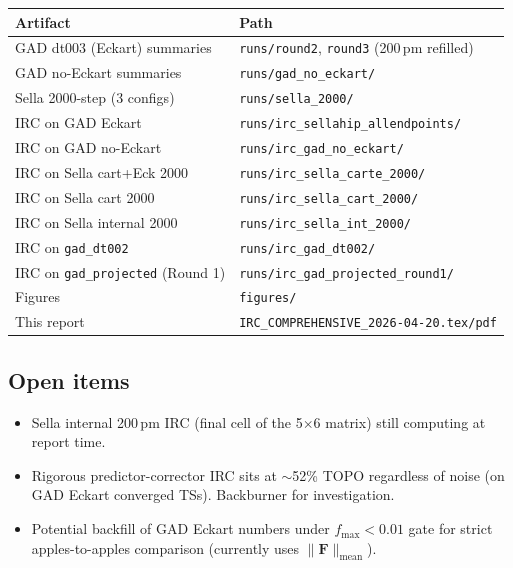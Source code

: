 \documentclass[11pt]{article}
\begin{document}
\begin{center}
\begin{tabular}{ll}
\toprule
Artifact & Path \\
\midrule
GAD dt003 (Eckart) summaries & \texttt{runs/round2}, \texttt{round3} (200\,pm refilled) \\
GAD no-Eckart summaries      & \texttt{runs/gad\_no\_eckart/} \\
Sella 2000-step (3 configs)  & \texttt{runs/sella\_2000/} \\
IRC on GAD Eckart            & \texttt{runs/irc\_sellahip\_allendpoints/} \\
IRC on GAD no-Eckart         & \texttt{runs/irc\_gad\_no\_eckart/} \\
IRC on Sella cart+Eck 2000   & \texttt{runs/irc\_sella\_carte\_2000/} \\
IRC on Sella cart 2000       & \texttt{runs/irc\_sella\_cart\_2000/} \\
IRC on Sella internal 2000   & \texttt{runs/irc\_sella\_int\_2000/} \\
IRC on \texttt{gad\_dt002}   & \texttt{runs/irc\_gad\_dt002/} \\
IRC on \texttt{gad\_projected} (Round 1) & \texttt{runs/irc\_gad\_projected\_round1/} \\
Figures                      & \texttt{figures/} \\
This report                  & \texttt{IRC\_COMPREHENSIVE\_2026-04-20.tex/pdf} \\
\bottomrule
\end{tabular}
\end{center}

\subsection{Open items}

\begin{itemize}[nosep,leftmargin=1.5em]
\item Sella internal 200\,pm IRC (final cell of the 5$\times$6 matrix) still
      computing at report time.
\item Rigorous predictor-corrector IRC sits at $\sim$52\% TOPO regardless
      of noise (on GAD Eckart converged TSs). Backburner for investigation.
\item Potential backfill of GAD Eckart numbers under $f_{\max}{<}0.01$ gate
      for strict apples-to-apples comparison (currently uses $\|\mathbf{F}\|_{\text{mean}}$).
\end{itemize}
\end{document}

